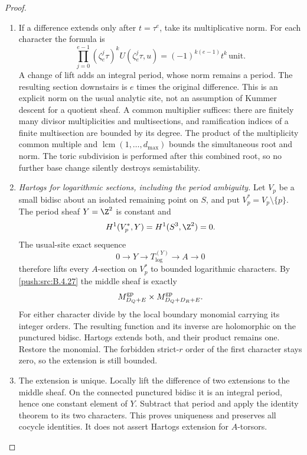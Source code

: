 \begin{proof}
\begin{enumerate}[label=\arabic*.,leftmargin=*]
\item If a difference extends only after
$t=\tau^e$, take its multiplicative norm.
For each character the formula is
\[
 \prod_{j=0}^{e-1}(\zeta_e^j\tau)^k
                      U(\zeta_e^j\tau,u)
   =(-1)^{k(e-1)}t^k\,\text{unit}.
 \tag{B.4.30.10}
\]
A change of lift adds an integral period,
whose norm remains a period. The resulting
section downstairs is $e$ times the original
difference. This is an explicit norm on the
usual analytic site, not an assumption of
Kummer descent for a quotient sheaf. A
common multiplier suffices: there are
finitely many divisor multiplicities and
multisections, and ramification indices of
a finite multisection are bounded by its
degree. The product of the multiplicity
common multiple and
$\operatorname{lcm}(1,\ldots,d_{\max})$
bounds the simultaneous root and norm.
The toric subdivision is performed after
this combined root, so no further base
change silently destroys semistability.

\item \emph{Hartogs for logarithmic sections, including the period ambiguity.}
Let $V_p$ be a small bidisc about an isolated
remaining point on $S$, and put
$V_p^*=V_p\setminus\{p\}$. The period sheaf
$Y=\Z^2$ is constant and
\[
 H^1(V_p^*,Y)=H^1(S^3,\Z^2)=0.
\]
The usual-site exact sequence
\[
 0\longrightarrow Y\longrightarrow
 T_{\log}^{(Y)}\longrightarrow A\longrightarrow0
 \tag{B.4.30.11}
\]
therefore lifts every $A$-section on $V_p^*$
to bounded logarithmic characters. By
\ref{push:src:B.4.27} the middle sheaf is exactly
\[
 M_{D_Q+E}^{\rm gp}\times
 M_{D_Q+D_R+E}^{\rm gp}.
\]
For either character divide by the local
boundary monomial carrying its integer
orders. The resulting function and its
inverse are holomorphic on the punctured
bidisc. Hartogs extends both, and their
product remains one. Restore the monomial.
The forbidden strict-$r$ order of the first
character stays zero, so the extension is
still bounded.

\item The extension is unique. Locally lift the
difference of two extensions to the middle
sheaf. On the connected punctured bidisc
it is an integral period, hence one constant
element of $Y$. Subtract that period and
apply the identity theorem to its two
characters. This proves uniqueness and
preserves all cocycle identities. It does
not assert Hartogs extension for $A$-torsors.


\end{enumerate}
\end{proof}
